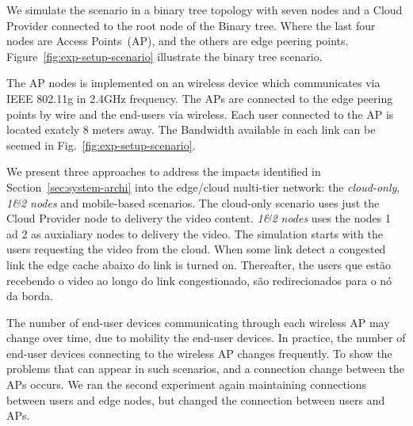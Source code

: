 
We simulate the scenario in a binary tree topology with seven nodes and a Cloud Provider connected to the root node of the Binary tree. Where the last four nodes are Access Points~(AP), and the others are edge peering points. Figure~\ref{fig:exp-setup-scenario} illustrate the binary tree scenario.

The AP nodes is implemented on an wireless device which communicates via IEEE 802.11g in 2.4GHz frequency. The APs are connected to the edge peering points by wire and the end-users via wireless. Each user connected to the AP is located exatcly 8 meters away. The Bandwidth available in each link can be seemed in Fig.~\ref{fig:exp-setup-scenario}.

We present three approaches to address the impacts identified in Section~\ref{sec:system-archi} into the edge/cloud multi-tier network: the \textit{cloud-only}, \textit{1\&2 nodes} and mobile-based scenarios. The cloud-only scenario uses just the Cloud Provider node to delivery the video content. \textit{1\&2 nodes} uses the nodes 1 ad 2 as auxialiary nodes to delivery the video. The simulation starts with the users requesting the video from the cloud. When some link detect a congested link  the edge cache abaixo do link is turned on. Thereafter, the users que estão recebendo o video ao longo do link congestionado, são redirecionados para o nó da borda. 

The number of end-user devices communicating through each wireless AP may change over time, due to mobility the end-user devices. In practice, the number of end-user devices connecting to the wireless AP changes frequently. 
To show the problems that can appear in such scenarios, and a connection change between the APs occurs. We ran the second experiment again maintaining connections between users and edge nodes, but changed the connection between users and APs.


